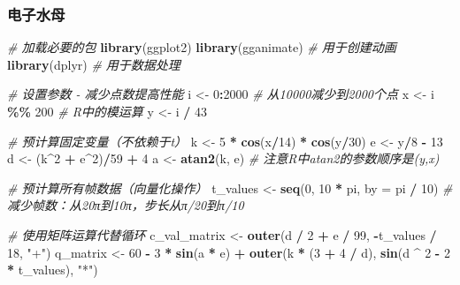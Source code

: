 \documentclass[
]{book}
\newenvironment{Shaded}{\begin{snugshade}}{\end{snugshade}}
\newcommand{\AttributeTok}[1]{\textcolor[rgb]{0.13,0.29,0.53}{#1}}
\newcommand{\CommentTok}[1]{\textcolor[rgb]{0.56,0.35,0.01}{\textit{#1}}}
\newcommand{\DecValTok}[1]{\textcolor[rgb]{0.00,0.00,0.81}{#1}}
\newcommand{\FunctionTok}[1]{\textcolor[rgb]{0.13,0.29,0.53}{\textbf{#1}}}
\newcommand{\NormalTok}[1]{#1}
\newcommand{\OtherTok}[1]{\textcolor[rgb]{0.56,0.35,0.01}{#1}}
\newcommand{\SpecialCharTok}[1]{\textcolor[rgb]{0.81,0.36,0.00}{\textbf{#1}}}
\newcommand{\StringTok}[1]{\textcolor[rgb]{0.31,0.60,0.02}{#1}}
\begin{document}
\hypertarget{ux7535ux5b50ux6c34ux6bcd}{%
\subsubsection{电子水母}\label{ux7535ux5b50ux6c34ux6bcd}}

\begin{Shaded}
\begin{Highlighting}[]
\CommentTok{\# 加载必要的包}
\FunctionTok{library}\NormalTok{(ggplot2)}
\FunctionTok{library}\NormalTok{(gganimate) }\CommentTok{\# 用于创建动画}
\FunctionTok{library}\NormalTok{(dplyr)     }\CommentTok{\# 用于数据处理}

\CommentTok{\# 设置参数 {-} 减少点数提高性能}
\NormalTok{i }\OtherTok{\textless{}{-}} \DecValTok{0}\SpecialCharTok{:}\DecValTok{2000}  \CommentTok{\# 从10000减少到2000个点}
\NormalTok{x }\OtherTok{\textless{}{-}}\NormalTok{ i }\SpecialCharTok{\%\%} \DecValTok{200}      \CommentTok{\# R中的模运算}
\NormalTok{y }\OtherTok{\textless{}{-}}\NormalTok{ i }\SpecialCharTok{/} \DecValTok{43}

\CommentTok{\# 预计算固定变量（不依赖于t）}
\NormalTok{k }\OtherTok{\textless{}{-}} \DecValTok{5} \SpecialCharTok{*} \FunctionTok{cos}\NormalTok{(x}\SpecialCharTok{/}\DecValTok{14}\NormalTok{) }\SpecialCharTok{*} \FunctionTok{cos}\NormalTok{(y}\SpecialCharTok{/}\DecValTok{30}\NormalTok{)}
\NormalTok{e }\OtherTok{\textless{}{-}}\NormalTok{ y}\SpecialCharTok{/}\DecValTok{8} \SpecialCharTok{{-}} \DecValTok{13}
\NormalTok{d }\OtherTok{\textless{}{-}}\NormalTok{ (k}\SpecialCharTok{\^{}}\DecValTok{2} \SpecialCharTok{+}\NormalTok{ e}\SpecialCharTok{\^{}}\DecValTok{2}\NormalTok{)}\SpecialCharTok{/}\DecValTok{59} \SpecialCharTok{+} \DecValTok{4}
\NormalTok{a }\OtherTok{\textless{}{-}} \FunctionTok{atan2}\NormalTok{(k, e)   }\CommentTok{\# 注意R中atan2的参数顺序是(y,x)}

\CommentTok{\# 预计算所有帧数据（向量化操作）}
\NormalTok{t\_values }\OtherTok{\textless{}{-}} \FunctionTok{seq}\NormalTok{(}\DecValTok{0}\NormalTok{, }\DecValTok{10} \SpecialCharTok{*}\NormalTok{ pi, }\AttributeTok{by =}\NormalTok{ pi }\SpecialCharTok{/} \DecValTok{10}\NormalTok{)  }\CommentTok{\# 减少帧数：从20π到10π，步长从π/20到π/10}

\CommentTok{\# 使用矩阵运算代替循环}
\NormalTok{c\_val\_matrix }\OtherTok{\textless{}{-}} \FunctionTok{outer}\NormalTok{(d }\SpecialCharTok{/} \DecValTok{2} \SpecialCharTok{+}\NormalTok{ e }\SpecialCharTok{/} \DecValTok{99}\NormalTok{, }\SpecialCharTok{{-}}\NormalTok{t\_values }\SpecialCharTok{/} \DecValTok{18}\NormalTok{, }\StringTok{"+"}\NormalTok{)}
\NormalTok{q\_matrix }\OtherTok{\textless{}{-}} \DecValTok{60} \SpecialCharTok{{-}} \DecValTok{3} \SpecialCharTok{*} \FunctionTok{sin}\NormalTok{(a }\SpecialCharTok{*}\NormalTok{ e) }\SpecialCharTok{+} \FunctionTok{outer}\NormalTok{(k }\SpecialCharTok{*}\NormalTok{ (}\DecValTok{3} \SpecialCharTok{+} \DecValTok{4} \SpecialCharTok{/}\NormalTok{ d), }\FunctionTok{sin}\NormalTok{(d }\SpecialCharTok{\^{}} \DecValTok{2} \SpecialCharTok{{-}} \DecValTok{2} \SpecialCharTok{*}\NormalTok{ t\_values), }\StringTok{"*"}\NormalTok{)}


\end{Highlighting}
\end{Shaded}
\end{document}
